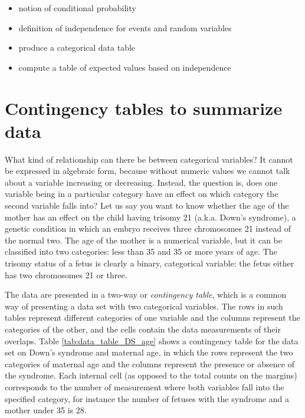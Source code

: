\documentclass[
]{book}
\theoremstyle{definition}
\theoremstyle{definition}
\theoremstyle{definition}
\theoremstyle{remark}
\begin{document}
\begin{itemize}
\item
  notion of conditional probability
\item
  definition of independence for events and random variables
\item
  produce a categorical data table
\item
  compute a table of expected values based on independence
\end{itemize}

\hypertarget{contingency-tables-to-summarize-data}{%
\section{Contingency tables to summarize data}\label{contingency-tables-to-summarize-data}}

What kind of relationship can there be between categorical variables? It cannot be expressed in algebraic form, because without numeric values we cannot talk about a variable increasing or decreasing. Instead, the question is, does one variable being in a particular category have an effect on which category the second variable falls into? Let us say you want to know whether the age of the mother has an effect on the child having trisomy 21 (a.k.a. Down's syndrome), a genetic condition in which an embryo receives three chromosomes 21 instead of the normal two. The age of the mother is a numerical variable, but it can be classified into two categories: less than 35 and 35 or more years of age. The trisomy status of a fetus is clearly a binary, categorical variable: the fetus either has two chromosomes 21 or three.

The data are presented in a two-way or \emph{contingency table}, which is a common way of presenting a data set with two categorical variables. The rows in such tables represent different categories of one variable and the columns represent the categories of the other, and the cells contain the data measurements of their overlaps. Table \ref{tab:data_table_DS_age} shows a contingency table for the data set on Down's syndrome and maternal age, in which the rows represent the two categories of maternal age and the columns represent the presence or absence of the syndrome. Each internal cell (as opposed to the total counts on the margins) corresponds to the number of measurement where both variables fall into the specified category, for instance the number of fetuses with the syndrome and a mother under 35 is 28.
\end{document}
